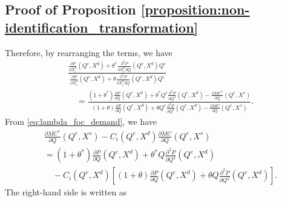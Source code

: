 \documentclass[11pt, a4paper]{article}
\theoremstyle{remark}
\begin{document}
\subsection{Proof of Proposition \ref{proposition:non-identification_transformation}}

Therefore, by rearranging the terms, we have
\begin{align}
    &\frac{\frac{\partial P}{\partial X^{d}_i}(Q^e, X^{d}) + \theta^{*}\frac{\partial^2 P}{\partial X^{d}_{i}\partial Q}(Q^e, X^{d})Q^e }{\frac{\partial P}{\partial X^{d}_i}(Q^e, X^{d}) + \theta\frac{\partial^2 P}{\partial X^{d}_{i}\partial Q}(Q^e, X^{d})Q^e}\\
    &\quad = \frac{(1+\theta^{*})\frac{\partial P}{\partial Q}(Q^e, X^{d}) + \theta^{*} Q^e\frac{\partial^2 P}{\partial Q^2}(Q^e, X^{d}) - \frac{\partial MC^{*}}{\partial Q}(Q^e, X^{s})}{(1+\theta)\frac{\partial P}{\partial Q}(Q^e, X^{d}) + \theta Q^e\frac{\partial^2 P}{\partial Q^2}(Q^e, X^{d}) - \frac{\partial MC}{\partial Q}(Q^e, X^{s})}. \label{eq:lambda_foc_demand}
\end{align}
From \eqref{eq:lambda_foc_demand}, we have
\begin{align}
    &\frac{\partial MC^{*}}{\partial Q}(Q^e, X^{s}) - C_i(Q^e, X^{d})\frac{\partial MC}{\partial Q}(Q^e, X^{s})\\
    & =  (1+ \theta^{*}) \frac{\partial P}{\partial Q}(Q^e, X^{d}) + \theta^{*} Q\frac{\partial^2 P}{\partial Q^2}(Q^e, X^{d})\\
    &\quad - C_i(Q^e, X^{d})\left[(1+ \theta) \frac{\partial P}{\partial Q}(Q^e, X^{d}) + \theta Q\frac{\partial^2 P}{\partial Q^2}(Q^e, X^{d})\right].\label{eq:mc_transformation_1}
\end{align}
The right-hand side is written as
\end{document}
